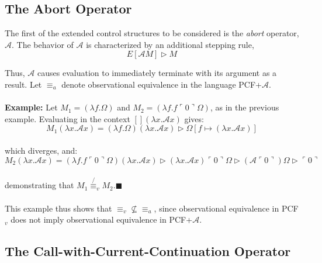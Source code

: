 \documentclass[a4paper,10pt]{article}
\begin{document}
\subsection{The Abort Operator}

The first of the extended control structures to be considered is the \emph{abort} operator,
$\mathcal{A}$.  The behavior of $\mathcal{A}$ is characterized by an additional stepping rule,\\
\[
 E[\mathcal{A} M] \rhd M
\]

Thus, $\mathcal{A}$ causes evaluation to immediately terminate with its argument as a result.
Let $\equiv_a$ denote observational equivalence in the language PCF+$\mathcal{A}$.\\
\\
\textbf{Example:} Let $M_1 = (\lambda f . \Omega)$ and $M_2 = (\lambda f . f \ulcorner 0 \urcorner
\Omega)$, as in the previous example.  Evaluating in the context $[](\lambda x . \mathcal{A} x)$
gives:\\
\[
 M_1 (\lambda x . \mathcal{A} x) = (\lambda f . \Omega) (\lambda x . \mathcal{A} x) \rhd
\Omega [f \mapsto (\lambda x . \mathcal{A} x)]
\]
\\
which diverges, and:\\
\[
 M_2 (\lambda x . \mathcal{A} x) = (\lambda f . f \ulcorner 0 \urcorner \Omega) (\lambda x .
\mathcal{A} x) \rhd (\lambda x . \mathcal{A} x) \ulcorner 0 \urcorner \Omega \rhd
(\mathcal{A} \ulcorner 0 \urcorner) \Omega \rhd \ulcorner 0 \urcorner
\]
\\
demonstrating that $M_1 \not{\equiv_v} M_2$.$\blacksquare$\\
\\
This example thus shows that $\equiv_v \nsubseteq \equiv_a$, since observational equivalence
in PCF$_v$ does not imply observational equivalence in PCF+$\mathcal{A}$.

\subsection{The Call-with-Current-Continuation Operator}
\end{document}
